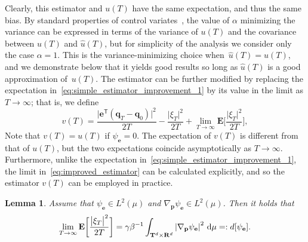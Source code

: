 \documentclass[11pt,a4paper]{article}
\newcommand{\expect}[0]{\mathbf{E}}
\newcommand{\real}{\mathbf R}
\newcommand{\torus}{\mathbf T}
\newcommand{\grad}{\nabla}
\newcommand{\vect}[1]{\boldsymbol{\mathbf #1}}
\renewcommand{\d}{\mathrm d}
\renewcommand{\t}{\mathsf T}
\theoremstyle{plain}
\newtheorem{lemma}[theorem]{Lemma}
\numberwithin{equation}{section}
\begin{document}
Clearly, this estimator and $u(T)$ have the same expectation, and thus the same bias.
By standard properties of control variates~\cite{kroese2013handbook},
the value of $\alpha$ minimizing the variance can be expressed in terms of the variance of $u(T)$ and
the covariance between $u(T)$ and $\widehat u(T)$,
but for simplicity of the analysis we consider only the case $\alpha = 1$.
This is the variance-minimizing choice when~$\widehat u(T) = u(T)$,
and we demonstrate below that it yields good results so long as $\widehat u(T)$ is a good approximation of~$u(T)$.
The estimator can be further modified by replacing the expectation in~\eqref{eq:simple_estimator_improvement_1} by its value in the limit as $T \to \infty$;
that is, we define
\begin{equation}
    \label{eq:improved_estimator}
    v(T) =  \frac{\bigl\lvert \vect e^\t(\vect q_T - \vect q_0) \bigr\rvert^2}{2T} - \frac{\bigl\lvert \xi_T \bigr\rvert^2}{2T} + \lim_{T \to \infty} \expect \biggl[\frac{\bigl\lvert \xi_T \bigr\rvert^2}{2T}\biggr],
\end{equation}
Note that $v(T) = u(T)$ if $\psi_{\vect e} = 0$.
The expectation of $v(T)$ is different from that of $u(T)$,
but the two expectations coincide asymptotically as $T \to \infty$.
Furthermore, unlike the expectation in~\eqref{eq:simple_estimator_improvement_1},
the limit in~\eqref{eq:improved_estimator} can be calculated explicitly,
and so the estimator $v(T)$ can be employed in practice.
\begin{lemma}
    \label{lemma:explicit_limit}
    Assume that $\psi_{\vect e} \in L^2(\mu)$ and $\grad_{\vect p} \psi_{\vect e} \in L^2(\mu)$.
    Then it holds that
    \begin{equation}
        \label{eq:explicit_limit}
        \lim_{T \to \infty} \expect \biggl[\frac{\bigl\lvert \xi_T \bigr\rvert^2}{2T}\biggr] = \gamma \beta^{-1} \int_{\torus^d \times \real^d} \abs{\grad_{\vect p} \psi_{\vect e}}^2 \, \d \mu =: d[\psi_{\vect e}].
    \end{equation}
\end{lemma}
\end{document}
